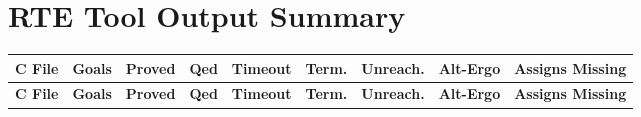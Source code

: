 \documentclass{article}
\begin{document}
\section*{RTE Tool Output Summary}

\scriptsize
\begin{longtable}{p{3.5cm} >{\centering\arraybackslash}p{0.8cm} >{\centering\arraybackslash}p{1.3cm} >{\centering\arraybackslash}p{0.7cm} >{\centering\arraybackslash}p{0.9cm} >{\centering\arraybackslash}p{0.9cm} >{\centering\arraybackslash}p{0.9cm} >{\centering\arraybackslash}p{1cm} >{\centering\arraybackslash}p{1.8cm}}
\toprule
\textbf{C File} & \textbf{Goals} & \textbf{Proved} & \textbf{Qed} & \textbf{Timeout} & \textbf{Term.} & \textbf{Unreach.} & \textbf{Alt-Ergo} & \textbf{Assigns Missing} \\
\midrule
\endfirsthead

\toprule
\textbf{C File} & \textbf{Goals} & \textbf{Proved} & \textbf{Qed} & \textbf{Timeout} & \textbf{Term.} & \textbf{Unreach.} & \textbf{Alt-Ergo} & \textbf{Assigns Missing} \\
\midrule
\endhead


\end{longtable}
\end{document}
